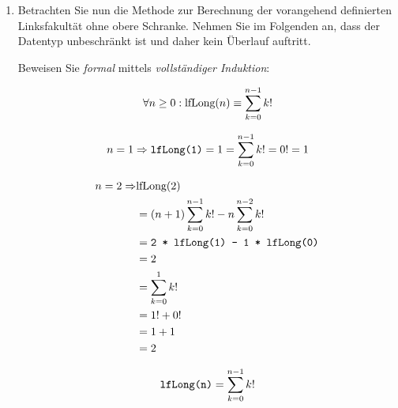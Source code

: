 \documentclass{bschlangaul-aufgabe}
\begin{document}
\begin{enumerate}

\item Betrachten Sie nun die Methode  zur
Berechnung der vorangehend definierten Linksfakultät ohne obere
Schranke. Nehmen Sie im Folgenden an, dass der Datentyp
 unbeschränkt ist und daher kein Überlauf auftritt.


Beweisen Sie \emph{formal} mittels \emph{vollständiger Induktion}:

\begin{displaymath}
\forall n \geq 0: \text{lfLong}(n) \equiv \sum^{n - 1}_{k=0}k!
\end{displaymath}

\begin{bAntwort}

%

\bInduktionAnfang

\begin{displaymath}
n=1 \Rightarrow
\texttt{\text{lfLong}(1)} =
1 =
\sum^{n - 1}_{k=0}k! =
0! =
1
\end{displaymath}

\begin{equation*}
\begin{split}
n=2 \Rightarrow & \text{lfLong}(2)\\
& = (n + 1) \sum^{n - 1}_{k=0}k! - n \sum^{n-2}_{k=0}k! \\
& = \texttt{2 * \text{lfLong}(1) - 1 * \text{lfLong}(0)} \\
& = 2 \\
& = \sum^{1}_{k=0}k! \\
& = 1! + 0! \\
& = 1 + 1 \\
& = 2
\end{split}
\end{equation*}

%

\bInduktionVoraussetzung

\begin{displaymath}
\texttt{\text{lfLong}(n)} = \sum^{n - 1}_{k=0}k!
\end{displaymath}

%

\bInduktionSchritt


\end{bAntwort}
\end{enumerate}
\end{document}
